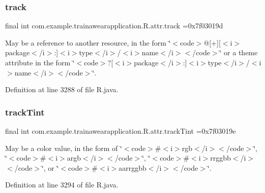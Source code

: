 \subsubsection{\texorpdfstring{track}{track}}
{\footnotesize\ttfamily final int com.\+example.\+trainawearapplication.\+R.\+attr.\+track =0x7f03019d\hspace{0.3cm}{\ttfamily [static]}}

May be a reference to another resource, in the form \char`\"{}$<$code$>$@\mbox{[}+\mbox{]}\mbox{[}$<$i$>$package$<$/i$>$\+:\mbox{]}$<$i$>$type$<$/i$>$/$<$i$>$name$<$/i$>$$<$/code$>$\char`\"{} or a theme attribute in the form \char`\"{}$<$code$>$?\mbox{[}$<$i$>$package$<$/i$>$\+:\mbox{]}$<$i$>$type$<$/i$>$/$<$i$>$name$<$/i$>$$<$/code$>$\char`\"{}. 

Definition at line 3288 of file R.\+java.

\mbox{\label{classcom_1_1example_1_1trainawearapplication_1_1_r_1_1attr_a99669c072a359dede0ac1bed4ca603fa}} 
\subsubsection{\texorpdfstring{trackTint}{trackTint}}
{\footnotesize\ttfamily final int com.\+example.\+trainawearapplication.\+R.\+attr.\+track\+Tint =0x7f03019e\hspace{0.3cm}{\ttfamily [static]}}

May be a color value, in the form of \char`\"{}$<$code$>$\#$<$i$>$rgb$<$/i$>$$<$/code$>$\char`\"{}, \char`\"{}$<$code$>$\#$<$i$>$argb$<$/i$>$$<$/code$>$\char`\"{}, \char`\"{}$<$code$>$\#$<$i$>$rrggbb$<$/i$>$$<$/code$>$\char`\"{}, or \char`\"{}$<$code$>$\#$<$i$>$aarrggbb$<$/i$>$$<$/code$>$\char`\"{}. 

Definition at line 3294 of file R.\+java.

\mbox{\label{classcom_1_1example_1_1trainawearapplication_1_1_r_1_1attr_a27b3589621c1e045bc8b3818fbfe69a9}} 
